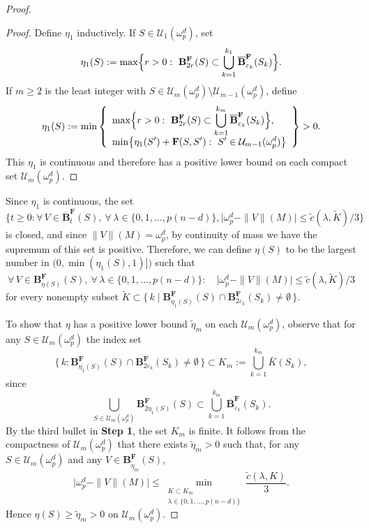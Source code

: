 \documentclass[12pt,english]{article}
\theoremstyle{definition}
\begin{document}
\begin{proof}
\begin{proof}
Define \(\eta_1\) inductively. If \(S\in\mathcal{U}_1(\omega^d_p)\), set
\[
    \eta_1(S):=\max\Bigl\{r>0:\ \mathbf{B}^\mathbf{F}_{2r}(S)\subset \bigcup_{k=1}^{k_1}\overline{\mathbf{B}}^\mathbf{F}_{\varepsilon_k}(S_k)\Bigr\}.
\]
If \(m\ge2\) is the least integer with \(S\in \mathcal{U}_m(\omega^d_p)\setminus \mathcal{U}_{m-1}(\omega^d_p)\), define
\[
    \eta_1(S):=\min\left\{
    \begin{array}{l}
    \displaystyle \max\Bigl\{r>0:\ \mathbf{B}^\mathbf{F}_{2r}(S)\subset \bigcup_{k=1}^{k_m}\overline{\mathbf{B}}^\mathbf{F}_{\varepsilon_k}(S_k)\Bigr\},\\[6pt]
    \displaystyle \min\bigl\{\eta_1(S')+\mathbf{F}(S,S'):\ S'\in \mathcal{U}_{m-1}(\omega^d_p)\bigr\}
    \end{array}\right\}>0.
\]
This \(\eta_1\) is continuous and therefore has a positive lower bound on each compact set \(\mathcal{U}_m(\omega^d_p)\).
\end{proof}

Since $\eta_1$ is continuous, the set $\{t\geq0: \forall\, V\in \overline{\mathbf{B}}^\mathbf{F}_{t}(S),\ \forall\,\lambda\in\{0,1,\dots,p(n-d)\},\bigl|\omega^d_p-\|V\|(M)\bigr|\le \tilde c(\lambda,\tilde K)/3\}$ is closed, and since $\|V\|(M)=\omega^d_p$, by continuity of mass we have the supremum of this set is positive. Therefore, we can define \(\eta(S)\) to be the largest number in \(\bigl(0,\min(\eta_1(S),1)]\bigr)\) such that
\[
    \forall\, V\in \mathbf{B}^\mathbf{F}_{\eta(S)}(S),\ \forall\,\lambda\in\{0,1,\dots,p(n-d)\}:\quad
    \bigl|\omega^d_p-\|V\|(M)\bigr|\le \tilde c(\lambda,\tilde K)/3
\]
for every nonempty subset \(\tilde K\subset \{\,k\mid \mathbf{B}^\mathbf{F}_{\eta_1(S)}(S)\cap \mathbf{B}^\mathbf{F}_{2\varepsilon_k}(S_k)\neq\emptyset\,\}\).

To show that \(\eta\) has a positive lower bound \(\tilde\eta_m\) on each \(\mathcal{U}_m(\omega^d_p)\), observe that for any \(S\in\mathcal{U}_m(\omega^d_p)\) the index set
\[
    \{\,k : \mathbf{B}^\mathbf{F}_{\eta_1(S)}(S)\cap \mathbf{B}^\mathbf{F}_{2\varepsilon_k}(S_k)\neq\emptyset\,\}
    \subset K_m:=\bigcup_{k=1}^{k_m}\bar K(S_k),
\]
since
\[\displaystyle \bigcup_{S\in\mathcal{U}_m(\omega^d_p)}\mathbf{B}^\mathbf{F}_{2\eta_1(S)}(S)\subset \bigcup_{k=1}^{k_m}\overline{\mathbf{B}}^\mathbf{F}_{\varepsilon_k}(S_k).\]
By the third bullet in \textbf{Step 1}, the set \(K_m\) is finite. It follows from the compactness of \(\mathcal{U}_m(\omega^d_p)\) that there exists \(\tilde\eta_m>0\) such that, for any \(S\in\mathcal{U}_m(\omega^d_p)\) and any \(V\in \mathbf{B}^\mathbf{F}_{\tilde\eta_m}(S)\),
\[
    \bigl|\omega^d_p-\|V\|(M)\bigr|\le \min_{\substack{K\subset K_m\\ \lambda\in\{0,1,\dots,p(n-d)\}}}\frac{\tilde c(\lambda,K)}{3}.
\]
Hence \(\eta(S)\ge \tilde\eta_m>0\) on \(\mathcal{U}_m(\omega^d_p)\).


\end{proof}
\end{document}
